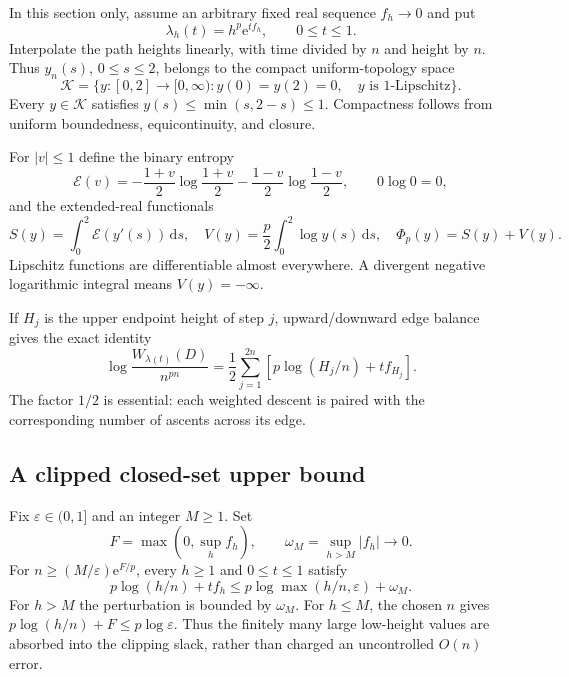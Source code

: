 \documentclass[11pt,letterpaper]{article}
\numberwithin{equation}{section}
\theoremstyle{remark}\newtheorem{remark}[theorem]{Remark}
\newcommand{\K}{\mathcal K}\newcommand{\ee}{\mathrm e}\newcommand{\dd}{\,\mathrm d}
\begin{document}
In this section only, assume an arbitrary fixed real sequence $f_h\to0$ and put
\begin{equation}\label{pwd:hm:eq:vanishing-family}
 \lambda_h(t)=h^p\ee^{tf_h},\qquad0\le t\le1.
\end{equation}
Interpolate the path heights linearly, with time divided by $n$ and height by $n$. Thus $y_n(s)$, $0\le s\le2$, belongs to the compact uniform-topology space
\[
 \K=\{y:[0,2]\to[0,\infty):y(0)=y(2)=0,\quad y\text{ is }1\text{-Lipschitz}\}.
\]
Every $y\in\K$ satisfies $y(s)\le\min(s,2-s)\le1$. Compactness follows from uniform boundedness, equicontinuity, and closure.

For $|v|\le1$ define the binary entropy
\[
 \mathcal E(v)=-\frac{1+v}{2}\log\frac{1+v}{2}
              -\frac{1-v}{2}\log\frac{1-v}{2},\qquad0\log0=0,
\]
and the extended-real functionals
\begin{equation}\label{pwd:hm:eq:variational}
 S(y)=\int_0^2\mathcal E(y'(s))\dd s,\quad
 V(y)=\frac p2\int_0^2\log y(s)\dd s,\quad
 \Phi_p(y)=S(y)+V(y).
\end{equation}
Lipschitz functions are differentiable almost everywhere. A divergent negative logarithmic integral means $V(y)=-\infty$.

If $H_j$ is the upper endpoint height of step $j$, upward/downward edge balance gives the exact identity
\begin{equation}\label{pwd:hm:eq:step-weight}
 \log\frac{W_{\lambda(t)}(D)}{n^{pn}}
 =\frac12\sum_{j=1}^{2n}\left[p\log(H_j/n)+tf_{H_j}\right].
\end{equation}
The factor $1/2$ is essential: each weighted descent is paired with the corresponding number of ascents across its edge.

\subsection{A clipped closed-set upper bound}
Fix $\varepsilon\in(0,1]$ and an integer $M\ge1$. Set
\[
 F=\max(0,\sup_h f_h),\qquad\omega_M=\sup_{h>M}|f_h|\longrightarrow0.
\]
For $n\ge(M/\varepsilon)\ee^{F/p}$, every $h\ge1$ and $0\le t\le1$ satisfy
\begin{equation}\label{pwd:hm:eq:clipping}
 p\log(h/n)+tf_h\le p\log\max(h/n,\varepsilon)+\omega_M.
\end{equation}
For $h>M$ the perturbation is bounded by $\omega_M$. For $h\le M$, the chosen $n$ gives $p\log(h/n)+F\le p\log\varepsilon$. Thus the finitely many large low-height values are absorbed into the clipping slack, rather than charged an uncontrolled $O(n)$ error.
\end{document}

